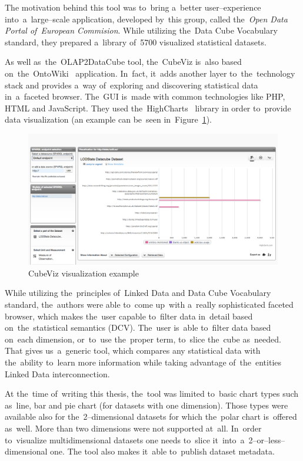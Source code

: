 The motivation behind this tool was to~bring a~better user--experience into~a~large--scale application, developed by~this group, called the~\emph{Open Data Portal of~European Commision}. While utilizing the~Data Cube Vocabulary standard, they 
prepared a~library of~5700 visualized statistical datasets.

\begin{sloppypar}
As well as~the~OLAP2DataCube tool, the~CubeViz is~also based on~the~\mbox{OntoWiki}~\cite{ontowiki}
application. In~fact, it~adds another layer to~the~technology stack and provides a~way of~exploring and discovering statistical 
data in~a~faceted browser. The~GUI is~made with common technologies like PHP,
HTML and JavaScript. They used the~HighCharts~\cite{highcharts} library in
order to~provide data visualization (an example can be~seen in~Figure~\ref{fig:cubeviz}).
\end{sloppypar}

\begin{figure}
	\centering
	\includegraphics[width=140mm]{img/cubeviz.png}
	\caption{CubeViz visualization example}
	\label{fig:cubeviz}
\end{figure}

While utilizing the~principles of~Linked Data and Data Cube Vocabulary 
standard, the~authors were able to~come up~with a~really sophisticated faceted 
browser, which makes the~user capable to~filter data in~detail based on~the~statistical 
semantics (DCV). The~user is~able to~filter data based on~each dimension, or~to~use the~proper term, to~slice the~cube as~needed. That gives us~a~generic tool, which 
compares any statistical data with the~ability to~learn more 
information while taking advantage of~the~entities Linked Data interconnection.

At the~time of~writing this thesis, the~tool was limited to~basic chart types
such as~line, bar and pie chart (for datasets with one dimension). Those types 
were available also for the~2--dimensional datasets for which the~polar 
chart is~offered as~well. More than two dimensions were not supported at~all. In~order to~visualize 
multidimensional datasets one needs to~slice it~into~a~2--or--less--dimensional one.
The tool also makes it~able to~publish dataset metadata.

